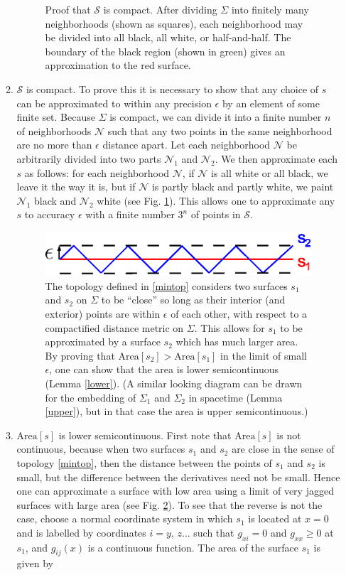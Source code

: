 \documentclass{article}
\begin{document}
\begin{enumerate}[resume]
\begin{enumerate}
\begin{figure}[hbt]
\caption{\footnotesize Proof that $\mathcal{S}$ is compact.  After dividing $\Sigma$ into finitely many neighborhoods (shown as squares), each neighborhood may be divided into all black, all white, or half-and-half.  The boundary of the black region (shown in green) gives an approximation to the red surface.
}\label{approx}
\end{figure}
	\item $\mathcal{S}$ is compact.  To prove this it is necessary to show that any choice of $s$ can be approximated to within any precision $\epsilon$ by an element of some finite set.  Because $\Sigma$ is compact, we can divide it into a finite number $n$ of neighborhoods $\mathcal{N}$ such that any two points in the same neighborhood are no more than $\epsilon$ distance apart.  Let each neighborhood $\mathcal{N}$ be arbitrarily divided into two parts $\mathcal{N}_1$ and $\mathcal{N}_2$.  We then approximate each $s$ as follows: for each neighborhood $\mathcal{N}$, if $\mathcal{N}$ is all white or all black, we leave it the way it is, but if $\mathcal{N}$ is partly black and partly white, we paint $\mathcal{N}_1$ black and $\mathcal{N}_2$ white (see Fig. \ref{approx}).  This allows one to approximate any $s$ to accuracy $\epsilon$ with a finite number $3^n$ of points in $\mathcal{S}$.
\begin{figure}[hbt]
\centering
\includegraphics[width=.6\textwidth]{jags.eps}
\caption{\footnotesize The topology defined in \ref{mintop} considers two surfaces $s_1$ and $s_2$ on $\Sigma$ to be ``close'' so long as their interior (and exterior) points are within $\epsilon$ of each other, with respect to a compactified distance metric on $\Sigma$.  This allows for $s_1$ to be approximated by a surface $s_2$ which has much larger area.  By proving that $\mathrm{Area}[s_2] > \mathrm{Area}[s_1]$ in the limit of small $\epsilon$, one can show that the area is lower semicontinuous (Lemma \ref{lower}).  (A similar looking diagram can be drawn for the embedding of $\Sigma_1$ and $\Sigma_2$ in spacetime (Lemma \ref{upper}), but in that case the area is upper semicontinuous.)
}\label{jags}
\end{figure}
	\item \label{lower} $\mathrm{Area}[s]$ is lower semicontinuous.  First note that $\mathrm{Area}[s]$ is not continuous, because when two surfaces $s_1$ and $s_2$ are close in the sense of topology \ref{mintop}, then the distance between the points of $s_1$ and $s_2$ is small, but the difference between the derivatives need not be small.  Hence one can approximate a surface with low area using a limit of very jagged surfaces with large area (see Fig. \ref{jags}).  To see that the reverse is not the case, choose a normal coordinate system in which $s_1$ is located at $x = 0$ and is labelled by coordinates $i = y,\,z\ldots$ such that $g_{xi} = 0$ and $g_{xx} \ge 0$ at $s_1$, and $g_{ij}(x)$ is a continuous function.  The area of the surface $s_1$ is given by

\end{enumerate}
\end{enumerate}
\end{document}
